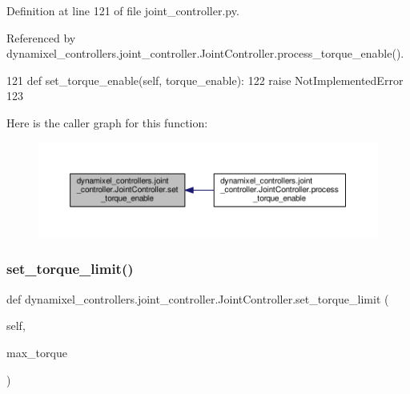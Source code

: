 Definition at line 121 of file joint\+\_\+controller.\+py.



Referenced by dynamixel\+\_\+controllers.\+joint\+\_\+controller.\+Joint\+Controller.\+process\+\_\+torque\+\_\+enable().


\begin{DoxyCode}
121     \textcolor{keyword}{def }set\_torque\_enable(self, torque\_enable):
122         \textcolor{keywordflow}{raise} NotImplementedError
123 
\end{DoxyCode}
Here is the caller graph for this function\+:
\nopagebreak
\begin{figure}[H]
\begin{center}
\leavevmode
\includegraphics[width=350pt]{d3/dcd/classdynamixel__controllers_1_1joint__controller_1_1_joint_controller_ad65f926abe6c4dec19d0a4dbd05d21d9_icgraph}
\end{center}
\end{figure}
\mbox{\label{classdynamixel__controllers_1_1joint__controller_1_1_joint_controller_a653d0406d8655dc9d75f12e1a523ba89}} 
\subsubsection{\texorpdfstring{set\+\_\+torque\+\_\+limit()}{set\_torque\_limit()}}
{\footnotesize\ttfamily def dynamixel\+\_\+controllers.\+joint\+\_\+controller.\+Joint\+Controller.\+set\+\_\+torque\+\_\+limit (\begin{DoxyParamCaption}\item[{}]{self,  }\item[{}]{max\+\_\+torque }\end{DoxyParamCaption})}



